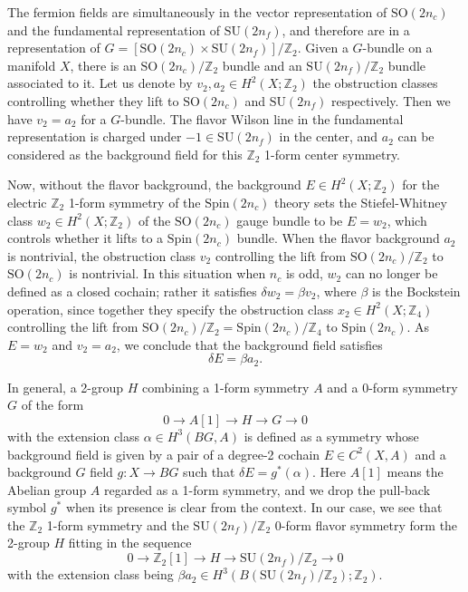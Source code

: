 \documentclass[12pt]{article}
\numberwithin{equation}{section}
\def\bZ{\mathbb{Z}}
\def\SU{\mathrm{SU}}
\def\SO{\mathrm{SO}}
\def\Spin{\mathrm{Spin}}
\begin{document}
The fermion fields are simultaneously in the vector representation of $\SO(2n_c)$ and the fundamental representation of $\SU(2n_f)$,
and therefore are in a representation of $G=[\SO(2n_c)\times \SU(2n_f)]/\bZ_2$.
Given a $G$-bundle on a manifold $X$,
there is an $\SO(2n_c)/\bZ_2$ bundle and an $\SU(2n_f)/\bZ_2$ bundle associated to it.
Let us denote by $v_2,a_2\in H^2(X;\bZ_2)$ the obstruction classes controlling whether they lift to $\SO(2n_c)$ and $\SU(2n_f)$ respectively. 
Then we have $v_2=a_2$ for a $G$-bundle.
The flavor Wilson line in the fundamental representation is charged under $-1\in \SU(2n_f)$ in the center,
and $a_2$ can be considered as the background field for this $\bZ_2$ 1-form center symmetry.

Now, without the flavor background,  the background $E\in H^2(X;\bZ_2)$ for the electric $\bZ_2$ 1-form symmetry of the $\Spin(2n_c)$ theory sets the Stiefel-Whitney class $w_2\in H^2(X;\bZ_2)$ of the $\SO(2n_c)$ gauge bundle to be $E=w_2$, which controls whether it lifts to a $\Spin(2n_c)$ bundle.
When the flavor background $a_2$ is nontrivial,
the obstruction class $v_2$ controlling the lift from $\SO(2n_c)/\bZ_2$ to $\SO(2n_c)$ is nontrivial.
In this situation when $n_c$ is odd, $w_2$ can no longer be defined as a closed cochain; rather it satisfies $\delta w_2 = \beta v_2$, where $\beta$ is the Bockstein operation,
since together they specify the obstruction class $x_2\in H^2(X;\bZ_4)$ 
controlling the lift from $\SO(2n_c)/\bZ_2=\Spin(2n_c)/\bZ_4$ to $\Spin(2n_c)$.
As $E=w_2$ and $v_2=a_2$, we conclude that the background field satisfies \begin{equation}
\delta E=\beta a_2.
\label{ba}
\end{equation}

In general, a 2-group $H$ combining a 1-form symmetry $A$ and a 0-form symmetry $G$ of the form \begin{equation}
0\to A[1]\to H\to G\to 0
\end{equation} with the extension class $\alpha\in H^3(BG,A)$ is defined as a symmetry whose background field is given by a pair of a degree-2 cochain $E\in C^2(X,A)$ and a background $G$ field $g:X\to BG$ such that $\delta E = g^*(\alpha)$.
Here $A[1]$ means the Abelian group $A$ regarded as a 1-form symmetry,
and we drop the pull-back symbol $g^*$ when its presence is clear from the context.
In our case, we see that the $\bZ_2$ 1-form symmetry and the $\SU(2n_f)/\bZ_2$ 0-form flavor symmetry form the 2-group $H$ fitting in the sequence \begin{equation}
0\to \bZ_2[1]\to H \to \SU(2n_f)/\bZ_2 \to 0
\label{group-extension}
\end{equation} with the extension class being $\beta a_2 \in H^3(B(\SU(2n_f)/\bZ_2);\bZ_2)$.
\end{document}
